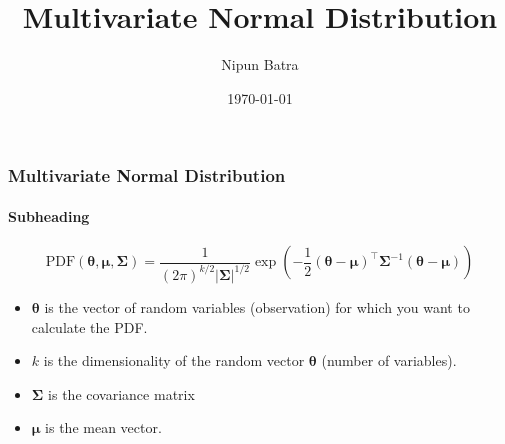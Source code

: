 \documentclass{beamer}
\begin{document}



\title{Multivariate Normal Distribution}
\author{Nipun Batra}
\date{\today}
\maketitle
{}




        

    \begin{frame}
        \frametitle{Multivariate Normal Distribution}
        \framesubtitle{Subheading}
        
        \begin{equation*}
            \text{PDF}(\boldsymbol{\theta}, \boldsymbol{\mu}, \boldsymbol{\Sigma}) = \frac{1}{(2 \pi)^{k / 2}|\boldsymbol{\Sigma}|^{1 / 2}} \exp \left(-\frac{1}{2}(\boldsymbol{\theta}-\boldsymbol{\mu})^{\top} \boldsymbol{\Sigma}^{-1}(\boldsymbol{\theta}-\boldsymbol{\mu})\right)
        \end{equation*}
        \pause
        \begin{itemize}
            \item $\boldsymbol{\theta}$ is the vector of random variables (observation) for which you want to calculate the PDF.
            \pause
            \item $k$ is the dimensionality of the random vector $\boldsymbol{\theta}$ (number of variables).
            \pause
            \item $\boldsymbol{\Sigma}$ is the covariance matrix
            \pause
            \item $\boldsymbol{\mu}$ is the mean vector.
        \end{itemize}
        
    \end{frame}
    
\end{document}

